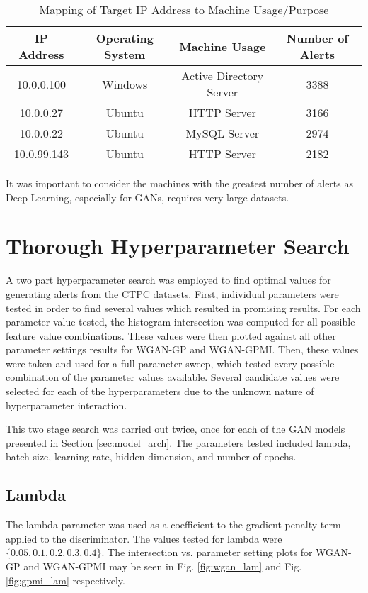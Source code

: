 \begin{table}[!htbp]
	\caption{Mapping of Target IP Address to Machine Usage/Purpose}
	\label{table:mapping}
	\centering
	\begin{tabular}{c|c|c|c}
		\textbf{IP Address} & \textbf{Operating System} & \textbf{Machine Usage} & \textbf{Number of Alerts}\\
		\hline 
		10.0.0.100 & Windows & Active Directory Server & 3388\\
		\hline
		10.0.0.27 & Ubuntu & HTTP Server & 3166\\
		\hline
		10.0.0.22 & Ubuntu & MySQL Server & 2974\\
		\hline
		10.0.99.143 & Ubuntu & HTTP Server & 2182
	\end{tabular}
\end{table}
 
It was important to consider the machines with the greatest number of alerts as Deep Learning, especially for GANs, requires very large datasets.

\section{Thorough Hyperparameter Search}
\label{sec:search}
A two part hyperparameter search was employed to find optimal values for generating alerts from the CTPC datasets. First, individual parameters were tested in order to find several values which resulted in promising results. For each parameter value tested, the histogram intersection was computed for all possible feature value combinations. These values were then plotted against all other parameter settings results for WGAN-GP and WGAN-GPMI. Then, these values were taken and used for a full parameter sweep, which tested every possible combination of the parameter values available. Several candidate values were selected for each of the hyperparameters due to the unknown nature of hyperparameter interaction.

This two stage search was carried out twice, once for each of the GAN models presented in Section \ref{sec:model_arch}. The parameters tested included lambda, batch size, learning rate, hidden dimension, and number of epochs.

\subsection{Lambda}
\label{sec:lam}
The lambda parameter was used as a coefficient to the gradient penalty term applied to the discriminator. The values tested for lambda were $\{0.05, 0.1, 0.2, 0.3, 0.4\}$. The intersection vs. parameter setting plots for WGAN-GP and WGAN-GPMI may be seen in Fig. \ref{fig:wgan_lam} and Fig. \ref{fig:gpmi_lam} respectively.

